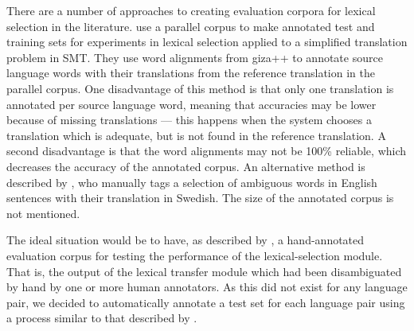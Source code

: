 \documentclass[11pt]{article}
\begin{document}
There are a number of approaches to creating evaluation corpora for
lexical selection in the literature. \cite{vickrey05} use a parallel
corpus to make annotated test and training sets for experiments in
lexical selection applied to a simplified translation problem in
SMT. They use word alignments from {\sc giza++} \citep{och03a} to
annotate source language words with their translations from the
reference translation in the parallel corpus. One disadvantage of this
method is that only one translation is annotated per source language
word, meaning that accuracies may be lower because of missing
translations --- this happens when the system chooses a translation
which is adequate, but is not found in the reference translation. A
second disadvantage is that the word alignments may not be 100\%
reliable, which decreases the accuracy of the annotated corpus. An
alternative method is described by \cite{zinovjeva2000}, who manually
tags a selection of ambiguous words in English sentences with their
translation in Swedish. The size of the annotated corpus is not
mentioned. 


The ideal situation would be to have, as described by
\cite{zinovjeva2000}, a hand-annotated evaluation corpus for testing
the performance of the lexical-selection module. That is, the output
of the lexical transfer module which had been disambiguated by hand by
one or more human annotators. As this did not exist for any language
pair, we decided to automatically annotate a test set for each
language pair using a process similar to that described by
\cite{vickrey05}. 

\end{document}
